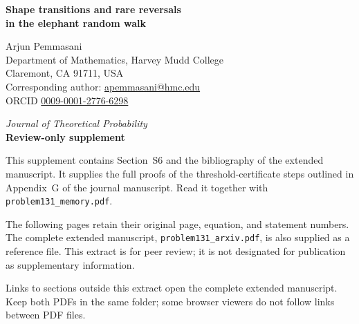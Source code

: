 \documentclass[11pt]{article}
\begin{document}
\begin{center}
{\Large\bfseries Shape transitions and rare reversals\\[4pt]
in the elephant random walk\par}
\bigskip
Arjun Pemmasani\\[4pt]
Department of Mathematics, Harvey Mudd College\\
Claremont, CA 91711, USA\\
Corresponding author: \href{mailto:apemmasani@hmc.edu}{apemmasani@hmc.edu}\\
ORCID \href{https://orcid.org/0009-0001-2776-6298}{0009-0001-2776-6298}\par
\bigskip
\emph{Journal of Theoretical Probability}\\[8pt]
{\large\bfseries Review-only supplement}
\end{center}
\bigskip
This supplement contains Section~S6 and the bibliography of the extended
manuscript. It supplies the full proofs of the threshold-certificate steps
outlined in Appendix~G of the journal manuscript. Read it together with
\texttt{problem131\_memory.pdf}.

The following pages retain their original page, equation, and statement
numbers. The complete extended manuscript, \texttt{problem131\_arxiv.pdf},
is also supplied as a reference file. This extract is for peer review; it
is not designated for publication as supplementary information.

Links to sections outside this extract open the complete extended manuscript.
Keep both PDFs in the same folder; some browser viewers do not follow links
between PDF files.
\end{document}
